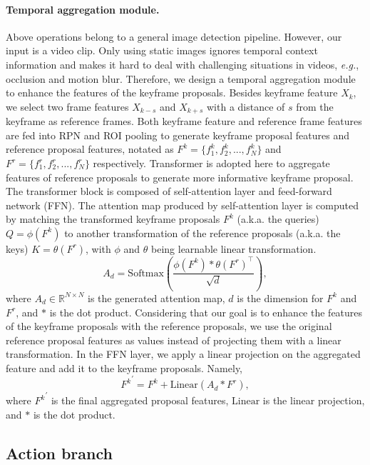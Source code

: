 \documentclass[final]{cvpr}
\begin{document}
\paragraph{Temporal aggregation module.}
Above operations belong to a general image detection pipeline. However, our input is a video clip. Only using static images ignores temporal  context information and makes it hard to deal with challenging situations in videos, \emph{e.g.}, occlusion and motion blur. Therefore, we design a temporal aggregation module to enhance the  features of the keyframe proposals. Besides keyframe feature $X_k$, we select two frame features $X_{k-s}$ and $X_{k+s}$ with a distance of $s$ from the keyframe as reference frames. Both keyframe feature and reference frame features are fed into RPN and ROI pooling to generate keyframe proposal features and reference proposal features, notated as $F^k=\{f^k_1,f^k_2,...,f^k_N\}$ and $F^r=\{f^r_1,f^r_2,...,f^r_N\}$ respectively. Transformer is adopted here to aggregate features of reference proposals to generate more informative keyframe proposal. 
The transformer block is composed of self-attention layer and feed-forward network (FFN). The attention map produced by self-attention layer is computed by matching the transformed keyframe proposals $F^k$ (a.k.a. the queries) $Q=\phi(F^k)$ to 
another transformation of the reference proposals (a.k.a. the keys) $K=\theta(F^r)$, with $\phi$ and $\theta$ being learnable linear transformation. 
\begin{equation}
    A_d = \textrm{Softmax}(\frac{\phi(F^k)*\theta(F^r)^\top }{\sqrt{d}}),
\end{equation}
where $A_d\in \mathbb{R}^{N\times N}$ is the generated attention map, $d$ is the dimension for $F^k$ and $F^r$, and $*$ is the dot product. 
Considering that our goal is to enhance the features of the keyframe proposals with the reference proposals, we use the original reference proposal features as values instead of projecting them with a linear transformation. In the FFN layer, we apply a linear projection on the aggregated feature and add it to the keyframe proposals. Namely,
\begin{equation}
    {F^k}^{\prime} = F^k + \textrm{Linear}(A_d * F^r),
\end{equation}
where ${F^k}^{\prime}$ is the final aggregated proposal features, $\textrm{Linear}$ is the linear projection, and $*$ is the dot product.

\subsection{Action branch}
\label{3.3}
\end{document}
